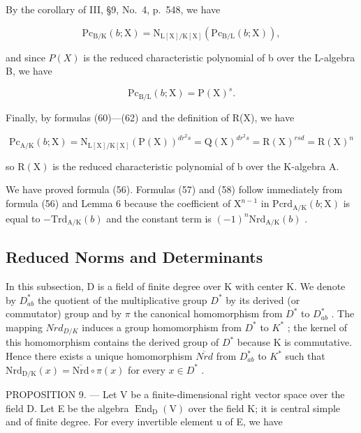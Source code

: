 By the corollary of III, §9, No.~4, p.~548, we have

\[
\mathrm{Pc} _ {\mathrm{B/K}} (b; \mathrm{X}) = \mathrm{N} _ {\mathrm{L[X] / K[X]}} (\mathrm{Pc} _ {\mathrm{B/L}} (b; \mathrm{X})),\tag{61}
\]

and since \(P(X)\) is the reduced characteristic polynomial of b over the L-algebra B, we have

\[
\mathrm{Pc} _ {\mathrm{B/L}} (b; \mathrm{X}) = \mathrm{P(X)} ^ {s}.\tag{62}
\]

Finally, by formulas (60)---(62) and the definition of R(X), we have

\[
\mathrm{Pc} _ {\mathrm{A/K}} (b; \mathrm{X}) = \mathrm{N} _ {\mathrm{L[X]/K[X]}} (\mathrm{P(X)}) ^ {d r ^ {2} s} = \mathrm{Q(X)} ^ {d r ^ {2} s} = \mathrm{R(X)} ^ {r s d} = \mathrm{R(X)} ^ {n}\tag{63}
\]

so \(\mathrm{R}(\mathrm{X})\) is the reduced characteristic polynomial of b over the K-algebra A.

We have proved formula (56). Formulas (57) and (58) follow immediately from formula (56) and Lemma 6 because the coefficient of \(\mathrm{X}^{n - 1}\) in \(\mathrm{Pcrd}_{\mathrm{A / K}}(b;\mathrm{X})\) is equal to \(-\mathrm{Trd}_{\mathrm{A / K}}(b)\) and the constant term is \((-1)^n\mathrm{Nrd}_{\mathrm{A / K}}(b)\) .

\subsection{Reduced Norms and Determinants}

In this subsection, D is a field of finite degree over K with center K. We denote by \(D_{ab}^{*}\) the quotient of the multiplicative group \(D^{*}\) by its derived (or commutator) group and by \(\pi\) the canonical homomorphism from \(D^{*}\) to \(D_{ab}^{*}\) . The mapping \(Nrd_{D/K}\) induces a group homomorphism from \(D^{*}\) to \(K^{*}\) ; the kernel of this homomorphism contains the derived group of \(D^{*}\) because K is commutative. Hence there exists a unique homomorphism \(\overline{Nrd}\) from \(D_{ab}^{*}\) to \(K^{*}\) such that \(\mathrm{Nrd}_{\mathrm{D/K}}(x)=\overline{\mathrm{Nrd}}\circ\pi(x)\) for every \(x\in D^{*}\) .

PROPOSITION 9. --- Let V be a finite-dimensional right vector space over the field D. Let E be the algebra \(\operatorname{End}_{\mathrm{D}}(\mathrm{V})\) over the field K; it is central simple and of finite degree. For every invertible element u of E, we have

